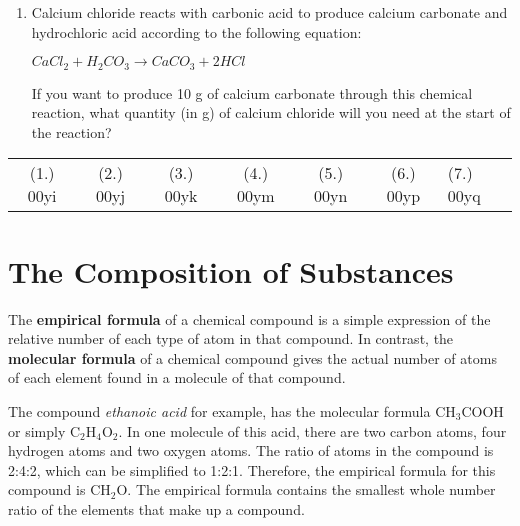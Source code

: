 {\begin{enumerate}
{\begin{enumerate}
\item{What mass of zinc will you need for the reaction, if all the sulfur is to be used up?}
\item{What mass of zinc sulfide will this reaction produce?}
\end{enumerate}
}

\item{Calcium chloride reacts with carbonic acid to produce calcium carbonate and hydrochloric acid according to the following equation:
\begin{center}
\rm${CaCl_{2} + H_{2}CO_{3} \rightarrow CaCO_{3} + 2HCl}$
\end{center}
If you want to produce 10 g of calcium carbonate through this chemical reaction, what quantity (in g) of calcium chloride will you need at the start of the reaction?}



\end{enumerate}
\practiceinfo

\begin{tabular}[h]{cccccc}
(1.) 00yi & (2.) 00yj & (3.) 00yk & (4.) 00ym & (5.) 00yn & (6.) 00yp & (7.) 00yq & 
 \end{tabular}
}







\section{The Composition of Substances}
\label{sec:quant:composition}

The \textbf{empirical formula} of a chemical compound is a simple expression of the relative number of each type of atom in that compound. In contrast, the \textbf{molecular formula} of a chemical compound gives the actual number of atoms of each element found in a molecule of that compound.



The compound \textit{ethanoic acid} for example, has the molecular formula CH$_{3}$COOH or simply C$_{2}$H$_{4}$O$_{2}$. In one molecule of this acid, there are two carbon atoms, four hydrogen atoms and two oxygen atoms. The ratio of atoms in the compound is 2:4:2, which can be simplified to 1:2:1. Therefore, the empirical formula for this compound is CH$_{2}$O. The empirical formula contains the smallest whole number ratio of the elements that make up a compound.\\

